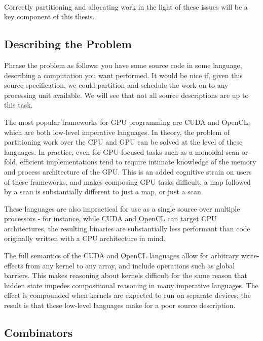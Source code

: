 \documentclass[a4paper,12pt]{article}
\begin{document}
\paragraph*{}
Correctly partitioning and allocating work in the light of these issues will be a key component of this thesis.

\subsection{Describing the Problem}

Phrase the problem as follows: you have some source code in some language, describing a computation you want performed. 
It would be nice if, given this source specification, we could partition and schedule the work on to any processing unit available. 
We will see that not all source descriptions are up to this task.

The most popular frameworks for GPU programming are CUDA and OpenCL, which are both low-level imperative languages. 
In theory, the problem of partitioning work over the CPU and GPU can be solved at the level of these languages. 
In practice, even for GPU-focused tasks such as a monoidal scan or fold, efficient implementations tend to require intimate knowledge of the memory and process architecture of the GPU. 
This is an added cognitive strain on users of these frameworks, and makes composing GPU tasks difficult: a map followed by a scan is substantially different to just a map, or just a scan.

These languages are also impractical for use as a single source over multiple processors - for instance, while CUDA and OpenCL can target CPU architectures, the resulting binaries are substantially less performant than code originally written with a CPU architecture in mind.

The full semantics of the CUDA and OpenCL languages allow for arbitrary write-effects from any kernel to any array, and include operations such as global barriers. 
This makes reasoning about kernels difficult for the same reason that hidden state impedes compositional reasoning in many imperative languages. 
The effect is compounded when kernels are expected to run on separate devices; the result is that these low-level languages make for a poor source description.

\subsection{Combinators}
\end{document}
